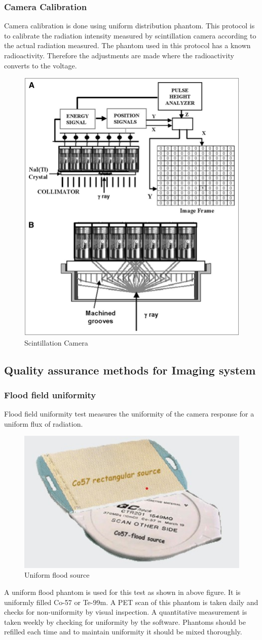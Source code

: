 \documentclass[12pt]{article}
\begin{document}
\subsubsection{Camera Calibration}
Camera calibration is done using uniform distribution phantom. This protocol is to calibrate the radiation intensity measured by scintillation camera according to the actual radiation measured. The phantom used in this protocol has a known radioactivity. Therefore the adjustments are made where the radioactivity converts to the voltage.
\begin{figure}[h!]
    \centering
    \includegraphics[width=0.45\linewidth]{scc.png}
    \caption{\small{Scintillation Camera}}
    \label{fig:Scintillation Camera}
\end{figure}

\subsection{Quality assurance methods for Imaging system}
\subsubsection{Flood field uniformity}
Flood field uniformity test measures the uniformity of the camera response for a uniform flux of radiation. 
\begin{figure}[h!]
    \centering
    \includegraphics[width=0.45\linewidth]{fs.jpg}
    \caption{\small{Uniform flood source}}
    \label{fig:Uniform flood source}
\end{figure}
A uniform flood phantom is used for this test as shown in above figure. It is uniformly filled Co-57 or Te-99m. A PET scan of this phantom is taken daily and checks for non-uniformity by visual inspection. A quantitative measurement is taken weekly by checking for uniformity by the software. Phantoms should be refilled each time and to maintain uniformity it should be mixed thoroughly.  
\end{document}
